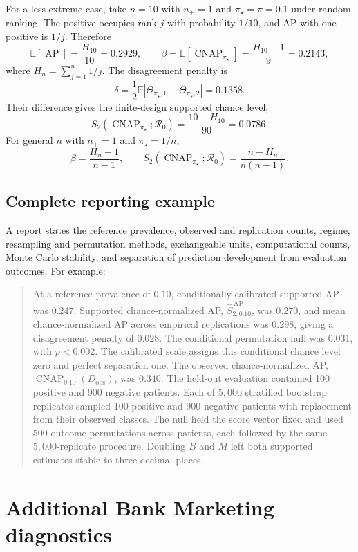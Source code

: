 \documentclass[11pt]{article}
\newcommand{\AP}{\operatorname{AP}}
\newcommand{\CNAP}{\operatorname{CNAP}}
\newcommand{\Regime}{\mathcal{R}}
\newcommand{\Tpi}{\CNAP_{\pi_\star}}
\newcommand{\E}{\mathbb{E}}
\theoremstyle{remark}
\begin{document}
For a less extreme case, take $n=10$ with $n_+=1$ and $\pi_\star=\pi=0.1$ under random ranking. The positive occupies rank $j$ with probability $1/10$, and AP with one positive is $1/j$. Therefore
\[
\E[\AP]=\frac{H_{10}}{10}=0.2929,
\qquad
\beta=\E[\Tpi]=\frac{H_{10}-1}{9}=0.2143,
\]
where $H_n=\sum_{j=1}^n1/j$. The disagreement penalty is
\[
\delta
=
\frac12\E\left|\Theta_{\pi_\star,1}-\Theta_{\pi_\star,2}\right|
=
0.1358.
\]
Their difference gives the finite-design supported chance level,
\begin{equation}
S_2(\CNAP_{\pi_\star};\Regime_0)
=
\frac{10-H_{10}}{90}
=
0.0786.
\label{eq:worked-null}
\end{equation}
For general $n$ with $n_+=1$ and $\pi_\star=1/n$,
\[
\beta=\frac{H_n-1}{n-1},
\qquad
S_2(\CNAP_{\pi_\star};\Regime_0)
=
\frac{n-H_n}{n(n-1)}.
\]

\subsection{Complete reporting example}
\label{app:report-example}

A report states the reference prevalence, observed and replication counts, regime, resampling and permutation methods, exchangeable units, computational counts, Monte Carlo stability, and separation of prediction development from evaluation outcomes. For example:
\begin{quote}
At a reference prevalence of $0.10$, conditionally calibrated supported AP was $0.247$. Supported chance-normalized AP, $\widehat S_{2,0.10}^{\,\mathrm{AP}}$, was $0.270$, and mean chance-normalized AP across empirical replications was $0.298$, giving a disagreement penalty of $0.028$. The conditional permutation null was $0.031$, with $p<0.002$. The calibrated scale assigns this conditional chance level zero and perfect separation one. The observed chance-normalized AP, $\CNAP_{0.10}(D_{\mathrm{obs}})$, was $0.340$. The held-out evaluation contained 100 positive and 900 negative patients. Each of $5{,}000$ stratified bootstrap replicates sampled 100 positive and 900 negative patients with replacement from their observed classes. The null held the score vector fixed and used $500$ outcome permutations across patients, each followed by the same $5{,}000$-replicate procedure. Doubling $B$ and $M$ left both supported estimates stable to three decimal places.
\end{quote}

\section{Additional Bank Marketing diagnostics}
\label{app:bank-diagnostics}
\end{document}
